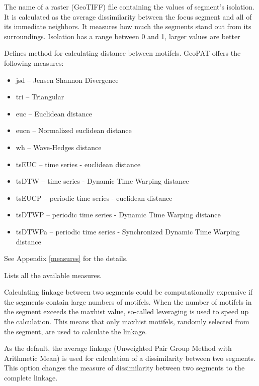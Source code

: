 
The name of a raster (GeoTIFF) file containing the values of segment's isolation. 
It is calculated as the average dissimilarity between the focus segment and all of its immediate neighbors.
It measures how much the segments stand out from its surroundings. 
Isolation has a range between 0 and 1, larger values are better


Defines method for calculating distance between motifels. 
GeoPAT offers the following measures: 
\begin{itemize}
	\item jsd -- Jensen Shannon Divergence
	\item tri -- Triangular
	\item euc -- Euclidean distance
	\item eucn -- Normalized euclidean distance
	\item wh -- Wave-Hedges distance
	\item tsEUC -- time series - euclidean distance
	\item tsDTW -- time series - Dynamic Time Warping distance
	\item tsEUCP -- periodic time series - euclidean distance
	\item tsDTWP -- periodic time series - Dynamic Time Warping distance
	\item tsDTWPa -- periodic time series - Synchronized Dynamic Time Warping distance
\end{itemize}
See Appendix \ref{measures} for the details.


Lists all the available measures.


Calculating linkage between two segments could be computationally expensive if the segments contain large numbers of motifels.
When the number of motifels in the segment exceeds the maxhist value, so-called leveraging is used to speed up the calculation.
This means that only maxhist motifels, randomly selected from the segment, are used to calculate the linkage.


As the default, the average linkage (Unweighted Pair Group Method with Arithmetic Mean) is used for calculation of a dissimilarity between two segments. 
This option changes the measure of dissimilarity between two segments to the complete linkage.

